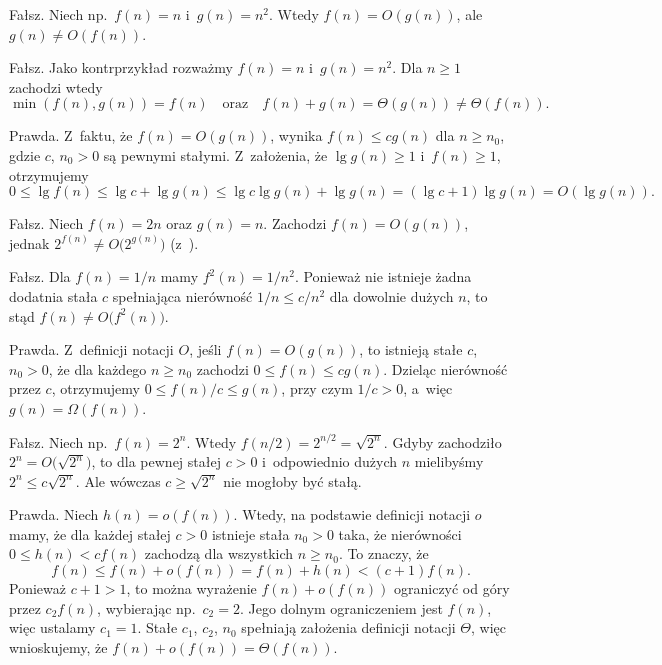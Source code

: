 
\subproblem %
Fałsz.
Niech np.\ $f(n)=n$ i~$g(n)=n^2$.
Wtedy $f(n)=O(g(n))$, ale $g(n)\ne O(f(n))$.

\subproblem %
Fałsz.
Jako kontrprzykład rozważmy $f(n)=n$ i~$g(n)=n^2$.
Dla $n\ge1$ zachodzi wtedy
\[
	\min(f(n),g(n)) = f(n) \quad\text{oraz}\quad f(n)+g(n) = \Theta(g(n)) \ne \Theta(f(n)).
\]

\subproblem %
Prawda.
Z~faktu, że $f(n)=O(g(n))$, wynika $f(n)\le cg(n)$ dla $n\ge n_0$, gdzie $c$, $n_0>0$ są pewnymi stałymi.
Z~założenia, że $\lg g(n)\ge1$ i~$f(n)\ge1$, otrzymujemy
\[
	0 \le \lg f(n) \le \lg c+\lg g(n) \le \lg c\lg g(n)+\lg g(n) = (\lg c+1)\lg g(n) = O(\lg g(n)).
\]

\subproblem %
Fałsz.
Niech $f(n)=2n$ oraz $g(n)=n$.
Zachodzi $f(n)=O(g(n))$, jednak $2^{f(n)}\ne O\bigl(2^{g(n)}\bigr)$ (z~).

\subproblem %
Fałsz.
Dla $f(n)=1/n$ mamy $f^2(n)=1/n^2$.
Ponieważ nie istnieje żadna dodatnia stała $c$ spełniająca nierówność $1/n\le c/n^2$ dla dowolnie dużych $n$, to stąd $f(n)\ne O\bigl(f^2(n)\bigr)$.

\subproblem %
Prawda.
Z~definicji notacji $O$, jeśli $f(n)=O(g(n))$, to istnieją stałe $c$, $n_0>0$, że dla każdego $n\ge n_0$ zachodzi $0\le f(n)\le cg(n)$.
Dzieląc nierówność przez $c$, otrzymujemy $0\le f(n)/c\le g(n)$, przy czym $1/c>0$, a~więc $g(n)=\Omega(f(n))$.

\subproblem %
Fałsz.
Niech np.\ $f(n)=2^n$.
Wtedy $f(n/2)=2^{n/2}=\sqrt{2^n}$.
Gdyby zachodziło $2^n=O\bigl(\!\sqrt{2^n}\bigr)$, to dla pewnej stałej $c>0$ i~odpowiednio dużych $n$ mielibyśmy $2^n\le c\sqrt{2^n}$.
Ale wówczas $c\ge\sqrt{2^n}$ nie mogłoby być stałą.

\subproblem %
Prawda.
Niech $h(n)=o(f(n))$.
Wtedy, na podstawie definicji notacji $o$ mamy, że dla każdej stałej $c>0$ istnieje stała $n_0>0$ taka, że nierówności $0\le h(n)<cf(n)$ zachodzą dla wszystkich $n\ge n_0$.
To znaczy, że
\[
	f(n) \le f(n)+o(f(n)) = f(n)+h(n) < (c+1)f(n).
\]
Ponieważ $c+1>1$, to można wyrażenie $f(n)+o(f(n))$ ograniczyć od góry przez $c_2f(n)$, wybierając np.\ $c_2=2$.
Jego dolnym ograniczeniem jest $f(n)$, więc ustalamy $c_1=1$.
Stałe $c_1$, $c_2$, $n_0$ spełniają założenia definicji notacji $\Theta$, więc wnioskujemy, że $f(n)+o(f(n))=\Theta(f(n))$.


